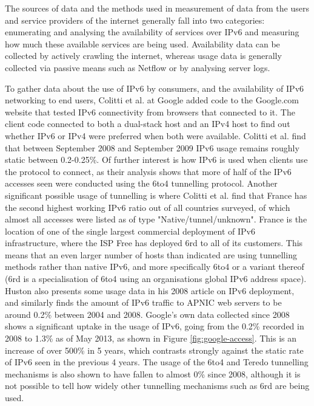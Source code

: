 The sources of data and the methods used in measurement of data from the users
and service providers of the internet generally fall into two categories:
enumerating and analysing the availability of services over IPv6 and measuring
how much these available services are being used. Availability data can be
collected by actively crawling the internet, whereas usage data is generally
collected via passive means such as Netflow\cite{shen_observations_2009} or by analysing server logs.

To gather data about the use of IPv6 by consumers, and the availability of IPv6
networking to end users, Colitti et al. at Google added code to the Google.com
website that tested IPv6 connectivity from browsers that connected to it. The
client code connected to both a dual-stack host and an IPv4 host to find out
whether IPv6 or IPv4 were preferred when both were available\cite{colitti_evaluating_2010}. Colitti et al.
find that between September 2008 and September 2009 IPv6 usage remains roughly
static between 0.2-0.25\%. Of further interest is how IPv6 is used when clients
use the protocol to connect, as their analysis shows that more of half of the IPv6 accesses
seen were conducted using the 6to4 tunnelling protocol. Another significant
possible usage of tunnelling is where Colitti et al. find that France has the
second highest working IPv6 ratio out of all countries surveyed, of which
almost all accesses were listed as of type "Native/tunnel/unknown". France is
the location of one of the single largest commercial deployment of IPv6
infrastructure, where the ISP Free has deployed 6rd\cite{rfc5569} to all of its
customers. This means that an even larger number of hosts than indicated are
using tunnelling methods rather than native IPv6, and more specifically 6to4 or
a variant thereof (6rd is a specialisation of 6to4 using an organisations
global IPv6 address space). Huston also presents some usage data in his 2008
article on IPv6 deployment, and similarly finds the amount of IPv6 traffic to
APNIC web servers to be around 0.2\% between 2004 and 2008\cite{huston_ipv6_2008}. Google's own data
collected since 2008 shows a significant uptake in the usage of IPv6, going from
the 0.2\% recorded in 2008 to 1.3\% as of May 2013, as shown in Figure
\ref{fig:google-access}. This is an increase of over
500\% in 5 years, which contrasts strongly against the static rate of IPv6 seen
in the previous 4 years. The usage of the 6to4 and Teredo tunnelling mechanisms
is also shown to have fallen to almost 0\% since 2008, although it is not
possible to tell how widely other tunnelling mechanisms such as 6rd are being
used.

